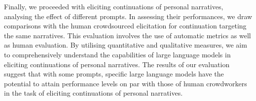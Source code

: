 Finally, we proceeded with eliciting continuations of personal narratives, analysing the effect of different prompts. In assessing their performances, we draw comparisons with the human crowdsourced elicitation for continuation targeting the same narratives. This evaluation involves the use of automatic metrics as well as human evaluation. By utilising quantitative and qualitative measures, we aim to comprehensively understand the capabilities of large language models in eliciting continuations of personal narratives. The results of our evaluation suggest that with some prompts, specific large language models have the potential to attain performance levels on par with those of human crowdworkers in the task of eliciting continuations of personal narratives. 


